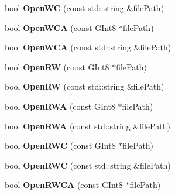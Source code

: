 \begin{DoxyCompactItemize}
\item 
\hypertarget{class_file_a59af5bcd660c07b62112ed170c5b6fd8}{bool {\bfseries Open\-W\-C} (const std\-::string \&file\-Path)}\label{class_file_a59af5bcd660c07b62112ed170c5b6fd8}

\item 
\hypertarget{class_file_a219d34e89ca4b03becca1c3b9d8632c0}{bool {\bfseries Open\-W\-C\-A} (const G\-Int8 $\ast$file\-Path)}\label{class_file_a219d34e89ca4b03becca1c3b9d8632c0}

\item 
\hypertarget{class_file_a581d0aa19d9ba96f804029dfdf649c1c}{bool {\bfseries Open\-W\-C\-A} (const std\-::string \&file\-Path)}\label{class_file_a581d0aa19d9ba96f804029dfdf649c1c}

\item 
\hypertarget{class_file_a101e5cae779471f1afe9e937fadc75a6}{bool {\bfseries Open\-R\-W} (const G\-Int8 $\ast$file\-Path)}\label{class_file_a101e5cae779471f1afe9e937fadc75a6}

\item 
\hypertarget{class_file_a7d23230071c7f41e666209d4bc019248}{bool {\bfseries Open\-R\-W} (const std\-::string \&file\-Path)}\label{class_file_a7d23230071c7f41e666209d4bc019248}

\item 
\hypertarget{class_file_a5877b69ca33c9e6815d06997a70d120f}{bool {\bfseries Open\-R\-W\-A} (const G\-Int8 $\ast$file\-Path)}\label{class_file_a5877b69ca33c9e6815d06997a70d120f}

\item 
\hypertarget{class_file_aebabb5ea39e6bfab86048b59f47ad68b}{bool {\bfseries Open\-R\-W\-A} (const std\-::string \&file\-Path)}\label{class_file_aebabb5ea39e6bfab86048b59f47ad68b}

\item 
\hypertarget{class_file_a28286377100e0d7f970debc305455b6e}{bool {\bfseries Open\-R\-W\-C} (const G\-Int8 $\ast$file\-Path)}\label{class_file_a28286377100e0d7f970debc305455b6e}

\item 
\hypertarget{class_file_acbbb7594b0c539e95d8642c285c436e1}{bool {\bfseries Open\-R\-W\-C} (const std\-::string \&file\-Path)}\label{class_file_acbbb7594b0c539e95d8642c285c436e1}

\item 
\hypertarget{class_file_a1dc088375aa7daa3b3bad6e1d2e64b32}{bool {\bfseries Open\-R\-W\-C\-A} (const G\-Int8 $\ast$file\-Path)}\label{class_file_a1dc088375aa7daa3b3bad6e1d2e64b32}


\end{DoxyCompactItemize}
